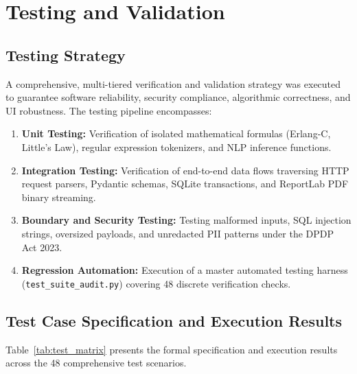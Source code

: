\chapter{Testing and Validation}

\section{Testing Strategy}
A comprehensive, multi-tiered verification and validation strategy was executed to guarantee software reliability, security compliance, algorithmic correctness, and UI robustness. The testing pipeline encompasses:
\begin{enumerate}
    \item \textbf{Unit Testing:} Verification of isolated mathematical formulas (Erlang-C, Little's Law), regular expression tokenizers, and NLP inference functions.
    \item \textbf{Integration Testing:} Verification of end-to-end data flows traversing HTTP request parsers, Pydantic schemas, SQLite transactions, and ReportLab PDF binary streaming.
    \item \textbf{Boundary and Security Testing:} Testing malformed inputs, SQL injection strings, oversized payloads, and unredacted PII patterns under the DPDP Act 2023.
    \item \textbf{Regression Automation:} Execution of a master automated testing harness (\texttt{test\_suite\_audit.py}) covering 48 discrete verification checks.
\end{enumerate}

\section{Test Case Specification and Execution Results}
Table~\ref{tab:test_matrix} presents the formal specification and execution results across the 48 comprehensive test scenarios.

